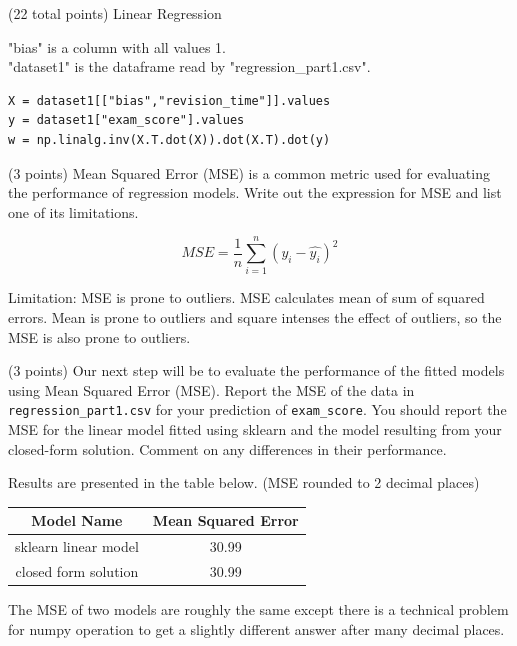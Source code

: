 \documentclass[12pt]{article}
\begin{document}
\begin{question}{(22 total points) Linear Regression}
\begin{subquestion}
\begin{answerbox}{20em}
"bias" is a column with all values 1. \\
"dataset1" is the dataframe read by "regression\_part1.csv".
\begin{verbatim}
X = dataset1[["bias","revision_time"]].values
y = dataset1["exam_score"].values
w = np.linalg.inv(X.T.dot(X)).dot(X.T).dot(y)    
\end{verbatim}
\end{answerbox}



\end{subquestion}



%
%
\begin{subquestion}{(3 points) Mean Squared Error (MSE) is a common metric used for evaluating the performance of regression models. 
Write out the expression for MSE and list one of its limitations. \\
}


\begin{answerbox}{10em}
\[ MSE = \frac{1}{n}\sum_{i=1}^{n}(y_{i}-\hat{y_{i}})^2 \]

Limitation: MSE is prone to outliers. MSE calculates mean of sum of squared errors. Mean is prone to outliers and square intenses the effect of outliers, so the MSE is also prone to outliers.
\end{answerbox}



\end{subquestion}


 
%
%
\begin{subquestion}{(3 points) Our next step will be to evaluate the performance of the fitted models using Mean Squared Error (MSE). 
Report the MSE of the data in \texttt{regression\_part1.csv} for your prediction of \texttt{exam\_score}.
You should report the MSE for the linear model fitted using sklearn and the model resulting from your closed-form solution. 
Comment on any differences in their performance. 
}


\begin{answerbox}{10em}
Results are presented in the table below. (MSE rounded to 2 decimal places)
\begin{center}
\begin{tabular}{|c|c|}
\hline
Model Name & Mean Squared Error\\
\hline
sklearn linear model & 30.99 \\
closed form solution & 30.99 \\
\hline
\end{tabular}
\end{center}
The MSE of two models are roughly the same except there is a technical problem for numpy operation to get a slightly different answer after many decimal places.
\end{answerbox}




\end{subquestion}
\end{question}
\end{document}
